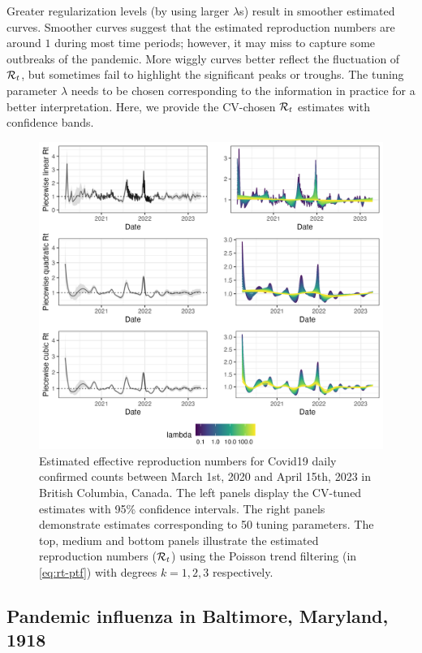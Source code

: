Greater regularization levels (by using larger $\lambda$s) result in smoother estimated curves. Smoother curves suggest that the estimated reproduction numbers are around $1$ during most time periods; however, it may miss to capture some outbreaks of the pandemic. More wiggly curves better reflect the fluctuation of $\mathcal{R}_t$, but sometimes fail to highlight the significant peaks or troughs. The tuning parameter $\lambda$ needs to be chosen corresponding to the information in practice for a better interpretation. Here, we provide the CV-chosen $\mathcal{R}_t$ estimates with confidence bands. 
\begin{figure}[tb]
    \centering
    \includegraphics[width=0.99\linewidth]{fig/covid_full_res.png}
    \caption{Estimated effective reproduction numbers for Covid19 daily confirmed counts between March 1st, 2020 and April 15th, 2023 in British Columbia, Canada. The left panels display the CV-tuned estimates with 95\% confidence intervals. The right panels demonstrate estimates corresponding to 50 tuning parameters. The top, medium and bottom panels illustrate the estimated reproduction numbers ($\mathcal{R}_t$) using the Poisson trend filtering (in \eqref{eq:rt-ptf}) with degrees $k=1,2,3$ respectively.} 
    \label{fig:covid-rt}
\end{figure} 


\subsection{Pandemic influenza in Baltimore, Maryland, 1918}

